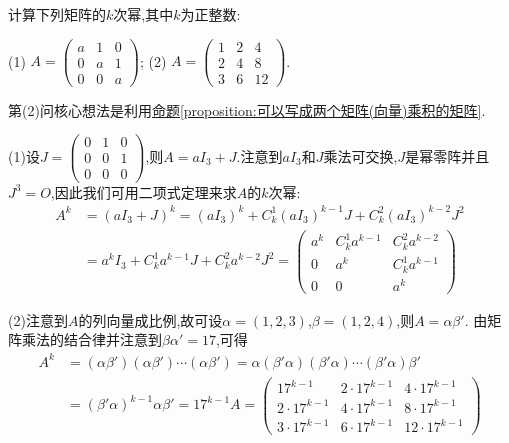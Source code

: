 \documentclass[../../main.tex]{subfiles}%
\begin{document}
\begin{example}
计算下列矩阵的\(k\)次幂,其中\(k\)为正整数:

(1) \(A=\begin{pmatrix}
a & 1 & 0 \\
0 & a & 1 \\
0 & 0 & a
\end{pmatrix}\);\quad
(2) \(A=\begin{pmatrix}
1 & 2 & 4 \\
2 & 4 & 8 \\
3 & 6 & 12
\end{pmatrix}\).
\end{example}
\begin{note}
第(2)问核心想法是利用\hyperref[proposition:可以写成两个矩阵(向量)乘积的矩阵]{命题\ref{proposition:可以写成两个矩阵(向量)乘积的矩阵}}.
\end{note}
\begin{solution}

(1)设\(J=\begin{pmatrix}
0 & 1 & 0 \\
0 & 0 & 1 \\
0 & 0 & 0
\end{pmatrix}\),则\(A = aI_{3}+J\).注意到\(aI_{3}\)和\(J\)乘法可交换,$J$是幂零阵并且\(J^{3}=O\),因此我们可用二项式定理来求\(A\)的\(k\)次幂:
\begin{align*}
A^{k}&=(aI_{3}+J)^{k}=(aI_{3})^{k}+C_{k}^{1}(aI_{3})^{k - 1}J+C_{k}^{2}(aI_{3})^{k - 2}J^{2}\\
&=a^{k}I_{3}+C_{k}^{1}a^{k - 1}J+C_{k}^{2}a^{k - 2}J^{2}=\begin{pmatrix}
a^{k}&C_{k}^{1}a^{k - 1}&C_{k}^{2}a^{k - 2}\\
0&a^{k}&C_{k}^{1}a^{k - 1}\\
0&0&a^{k}
\end{pmatrix}
\end{align*}

(2)注意到\(A\)的列向量成比例,故可设\(\alpha=(1,2,3)\),\(\beta=(1,2,4)\),则\(A = \alpha\beta'\).
由矩阵乘法的结合律并注意到\(\beta\alpha' = 17\),可得
\begin{align*}
A^{k}&=(\alpha\beta')(\alpha\beta')\cdots(\alpha\beta')=\alpha(\beta'\alpha)(\beta'\alpha)\cdots(\beta'\alpha)\beta'\\
&=(\beta'\alpha)^{k - 1}\alpha\beta'=17^{k - 1}A=
\begin{pmatrix}
17^{k - 1}&2\cdot17^{k - 1}&4\cdot17^{k - 1}\\
2\cdot17^{k - 1}&4\cdot17^{k - 1}&8\cdot17^{k - 1}\\
3\cdot17^{k - 1}&6\cdot17^{k - 1}&12\cdot17^{k - 1}
\end{pmatrix}
\end{align*}

\end{solution}
\end{document}
